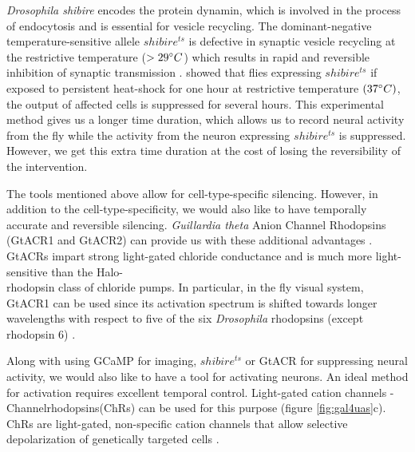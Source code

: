 \textit{Drosophila shibire} encodes the protein dynamin, which is involved in the process of endocytosis and is essential for vesicle recycling. The dominant-negative temperature-sensitive allele $shibire^{ts}$ is defective in synaptic vesicle recycling at the restrictive temperature ($>29\degree C$) which results in rapid and reversible inhibition of synaptic transmission \parencite{Kitamoto2001}. \cite{Joesch2010} showed that flies expressing $shibire^{ts}$ if exposed to persistent heat-shock for one hour at restrictive temperature $(37\degree C)$, the output of affected cells is suppressed for several hours. This experimental method gives us a longer time duration, which allows us to record neural activity from the fly while the activity from the neuron expressing $shibire^{ts}$ is suppressed. However, we get this extra time duration at the cost of losing the reversibility of the intervention.

The tools mentioned above allow for cell-type-specific silencing. However, in addition to the cell-type-specificity, we would also like to have temporally accurate and reversible silencing. \textit{Guillardia theta} Anion Channel Rhodopsins (GtACR1 and GtACR2) can provide us with these additional advantages \parencite{Govorunova2015}. GtACRs impart strong light-gated chloride conductance and is much more light-sensitive than the Halo-\\rhodopsin class of chloride pumps. In particular, in the fly visual system, GtACR1 can be used since its activation spectrum is shifted towards longer wavelengths with respect to five of the six \textit{Drosophila} rhodopsins (except rhodopsin 6) \parencite{Mauss2017, Mohammad2017}. %
 
Along with using GCaMP for imaging, $shibire^{ts}$ or GtACR for suppressing neural activity, we would also like to have a tool for activating neurons. An ideal method for activation requires excellent temporal control. Light-gated cation channels - Channelrhodopsins(ChRs) can be used for this purpose (figure  \ref{fig:gal4uas}c). ChRs are light-gated, non-specific cation channels that allow selective depolarization of genetically targeted cells \parencite{Lin2013, Busch2018}. 

